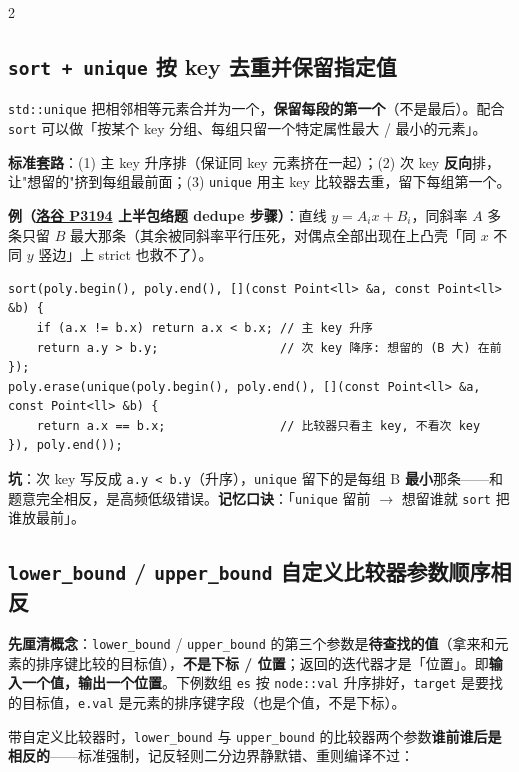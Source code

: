 \begin{multicols*}{2}
		\subsection{\texttt{sort + unique} 按 key 去重并保留指定值}

		\texttt{std::unique} 把相邻相等元素合并为一个，\textbf{保留每段的第一个}（不是最后）。配合 \texttt{sort} 可以做「按某个 key 分组、每组只留一个特定属性最大 / 最小的元素」。

		\textbf{标准套路}：(1) 主 key 升序排（保证同 key 元素挤在一起）；(2) 次 key \textbf{反向}排，让"想留的"挤到每组最前面；(3) \texttt{unique} 用主 key 比较器去重，留下每组第一个。

		\textbf{例（\href{https://www.luogu.com.cn/problem/P3194}{洛谷 P3194} 上半包络题 dedupe 步骤）}：直线 $y = A_i x + B_i$，同斜率 $A$ 多条只留 $B$ 最大那条（其余被同斜率平行压死，对偶点全部出现在上凸壳「同 $x$ 不同 $y$ 竖边」上 strict 也救不了）。

		\begin{verbatim}
sort(poly.begin(), poly.end(), [](const Point<ll> &a, const Point<ll> &b) {
	if (a.x != b.x) return a.x < b.x; // 主 key 升序
	return a.y > b.y;                 // 次 key 降序: 想留的 (B 大) 在前
});
poly.erase(unique(poly.begin(), poly.end(), [](const Point<ll> &a, const Point<ll> &b) {
	return a.x == b.x;                // 比较器只看主 key, 不看次 key
}), poly.end());
		\end{verbatim}

		\textbf{坑}：次 key 写反成 \texttt{a.y < b.y}（升序），\texttt{unique} 留下的是每组 B \textbf{最小}那条——和题意完全相反，是高频低级错误。\textbf{记忆口诀}：「\texttt{unique} 留前 $\to$ 想留谁就 \texttt{sort} 把谁放最前」。

		\subsection{\texttt{lower\_bound} / \texttt{upper\_bound} 自定义比较器参数顺序相反}

		\textbf{先厘清概念}：\texttt{lower\_bound} / \texttt{upper\_bound} 的第三个参数是\textbf{待查找的值}（拿来和元素的排序键比较的目标值），\textbf{不是下标 / 位置}；返回的迭代器才是「位置」。即\textbf{输入一个值，输出一个位置}。下例数组 \texttt{es} 按 \texttt{node::val} 升序排好，\texttt{target} 是要找的目标值，\texttt{e.val} 是元素的排序键字段（也是个值，不是下标）。

		带自定义比较器时，\texttt{lower\_bound} 与 \texttt{upper\_bound} 的比较器两个参数\textbf{谁前谁后是相反的}——标准强制，记反轻则二分边界静默错、重则编译不过：


\end{multicols*}
